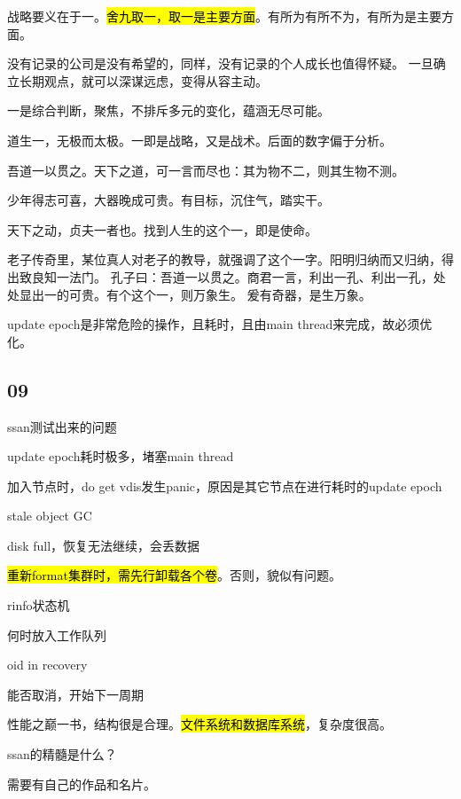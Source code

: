 战略要义在于一。\hl{舍九取一，取一是主要方面}。有所为有所不为，有所为是主要方面。

没有记录的公司是没有希望的，同样，没有记录的个人成长也值得怀疑。
一旦确立长期观点，就可以深谋远虑，变得从容主动。

一是综合判断，聚焦，不排斥多元的变化，蕴涵无尽可能。

道生一，无极而太极。一即是战略，又是战术。后面的数字偏于分析。

吾道一以贯之。天下之道，可一言而尽也：其为物不二，则其生物不测。

少年得志可喜，大器晚成可贵。有目标，沉住气，踏实干。

天下之动，贞夫一者也。找到人生的这个一，即是使命。

老子传奇里，某位真人对老子的教导，就强调了这个一字。阳明归纳而又归纳，得出致良知一法门。
孔子曰：吾道一以贯之。商君一言，利出一孔、利出一孔，处处显出一的可贵。有个这个一，则万象生。
爰有奇器，是生万象。

\hrulefill

update epoch是非常危险的操作，且耗时，且由main thread来完成，故必须优化。

\subsection{09}

ssan测试出来的问题
\begin{enumbox}
\item update epoch耗时极多，堵塞main thread
\item 加入节点时，do get vdis发生panic，原因是其它节点在进行耗时的update epoch
\item stale object GC
\item disk full，恢复无法继续，会丢数据
\end{enumbox}

\hl{重新format集群时，需先行卸载各个卷}。否则，貌似有问题。

rinfo状态机
\begin{enumbox}
\item 何时放入工作队列
\item oid in recovery
\item 能否取消，开始下一周期
\end{enumbox}

\hrulefill

性能之巅一书，结构很是合理。\hl{文件系统和数据库系统}，复杂度很高。

ssan的精髓是什么？

需要有自己的作品和名片。

